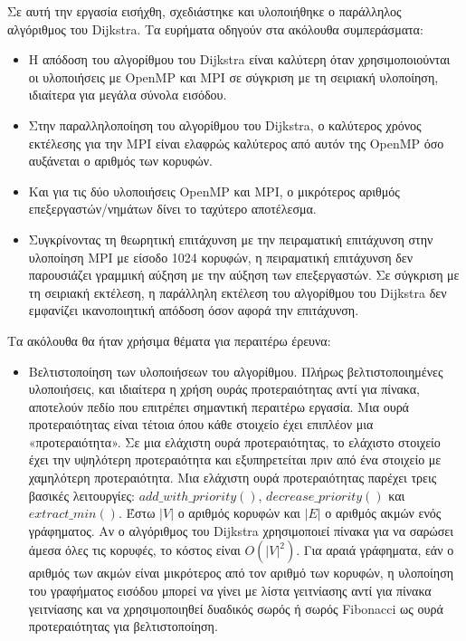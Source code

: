 \documentclass[12pt,a4paper]{article} %
\begin{document}
{Σε αυτή την εργασία εισήχθη, σχεδιάστηκε και υλοποιήθηκε ο παράλληλος αλγόριθμος του Dijkstra. Τα ευρήματα οδηγούν στα ακόλουθα συμπεράσματα:
\begin{itemize}
\item Η απόδοση του αλγορίθμου του Dijkstra είναι καλύτερη όταν χρησιμοποιούνται οι υλοποιήσεις με OpenMP και MPI σε σύγκριση με τη σειριακή υλοποίηση, ιδιαίτερα για μεγάλα σύνολα εισόδου.
\item Στην παραλληλοποίηση του αλγορίθμου του Dijkstra, ο καλύτερος χρόνος εκτέλεσης για την MPI είναι ελαφρώς καλύτερος από αυτόν της OpenMP όσο αυξάνεται ο αριθμός των κορυφών.
\item Και για τις δύο υλοποιήσεις OpenMP και MPI, ο μικρότερος αριθμός επεξεργαστών/νημάτων δίνει το ταχύτερο αποτέλεσμα.
\item Συγκρίνοντας τη θεωρητική επιτάχυνση με την πειραματική επιτάχυνση στην υλοποίηση MPI με είσοδο 1024 κορυφών, η πειραματική επιτάχυνση δεν παρουσιάζει γραμμική αύξηση με την αύξηση των επεξεργαστών. Σε σύγκριση με τη σειριακή εκτέλεση, η παράλληλη εκτέλεση του αλγορίθμου του Dijkstra δεν εμφανίζει ικανοποιητική απόδοση όσον αφορά την επιτάχυνση.
\end{itemize}
\vspace{0.3cm}

Τα ακόλουθα θα ήταν χρήσιμα θέματα για περαιτέρω έρευνα:
\begin{itemize}
\item Βελτιστοποίηση των υλοποιήσεων του αλγορίθμου. Πλήρως βελτιστοποιημένες υλοποιήσεις, και ιδιαίτερα η χρήση ουράς προτεραιότητας αντί για πίνακα, αποτελούν πεδίο που επιτρέπει σημαντική περαιτέρω εργασία. Μια ουρά προτεραιότητας είναι τέτοια όπου κάθε στοιχείο έχει επιπλέον μια «προτεραιότητα». Σε μια ελάχιστη ουρά προτεραιότητας, το ελάχιστο στοιχείο έχει την υψηλότερη προτεραιότητα και εξυπηρετείται πριν από ένα στοιχείο με χαμηλότερη προτεραιότητα. Μια ελάχιστη ουρά προτεραιότητας παρέχει τρεις βασικές λειτουργίες: \texttt{$add\_with\_priority()$}, \texttt{$decrease\_priority()$} και \texttt{$extract\_min()$}. Έστω $|V|$ ο αριθμός κορυφών και $|E|$ ο αριθμός ακμών ενός γράφηματος. Αν ο αλγόριθμος του Dijkstra χρησιμοποιεί πίνακα για να σαρώσει άμεσα όλες τις κορυφές, το κόστος είναι $O(|V|^{2})$. Για αραιά γράφηματα, εάν ο αριθμός των ακμών είναι μικρότερος από τον αριθμό των κορυφών, η υλοποίηση του γραφήματος εισόδου μπορεί να γίνει με λίστα γειτνίασης αντί για πίνακα γειτνίασης και να χρησιμοποιηθεί δυαδικός σωρός ή σωρός Fibonacci ως ουρά προτεραιότητας για βελτιστοποίηση.


\end{itemize}}
\end{document}
